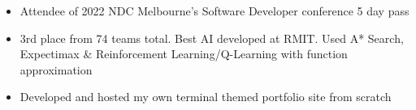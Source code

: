 \twocolumnsection
{
\begin{skills}
\end{skills}}
{
\vspace{1em}
\begin{itemize}
	\item Attendee of 2022 NDC Melbourne's Software Developer conference 5 day pass
	\item 3rd place from 74 teams total. Best AI developed at RMIT. Used A* Search, Expectimax \& Reinforcement Learning/Q-Learning with function approximation
    \item Developed and hosted my own terminal themed portfolio site from scratch
\end{itemize}
}
